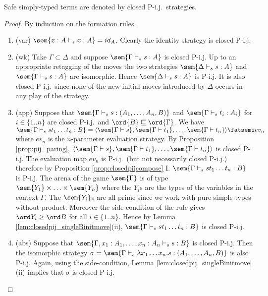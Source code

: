\begin{proposition}
\label{prop:safe_closepij_sem}
  Safe simply-typed terms are denoted by closed P-i.j.\ strategies.
\end{proposition}
\begin{proof}
  By induction on the formation rules.
  \begin{enumerate}
    \item (var) $\sem{x:A \vdash_s x:A } = id_A$. Clearly the
    identity strategy is closed P-i.j.

    \item (wk) Take $\Gamma \subset \Delta $ and suppose $\sem{\Gamma \vdash_s
    s : A}$ is closed P-i.j. Up to an appropriate retagging of
    the moves the two strategies $\sem{\Delta \vdash_s s : A}$
    and $\sem{\Gamma \vdash_s s : A}$ are isomorphic. Hence
    $\sem{\Delta \vdash_s s : A}$ is P-i.j. It is also closed
    P-i.j.\ since none of the new initial moves introduced by
    $\Delta$ occurs in any play of the strategy.

    \item (app) Suppose that $\sem{\Gamma \vdash_s s :
    (A_1,\ldots,A_n,B)}$ and $\sem{\Gamma \vdash_s t_i : A_i}$
    for $i \in \{1..n\}$ are closed P-i.j.\ and $\ord{B}
    \sqsubseteq \ord{\Gamma}$. We have $\sem{ \Gamma \vdash_s s
    t_1 \ldots t_n : B} = \langle \sem{\Gamma \vdash s},
    \sem{\Gamma \vdash t_1}, \ldots, \sem{\Gamma \vdash t_n}
    \rangle \fatsemi ev_n$ where $ev_n$ is the $n$-parameter
    evaluation strategy. By Proposition \ref{prop:pij_paring},
    $\langle \sem{\Gamma \vdash s}, \sem{\Gamma \vdash t_1} ,
    \ldots, \sem{\Gamma \vdash t_n} \rangle$ is closed P-i.j.
    The evaluation map $ev_n$ is P-i.j.\ (but not necessarily
    closed P-i.j.) therefore by Proposition
    \ref{prop:closedpijcompose} I. $\sem{ \Gamma \vdash_s s t_1
    \ldots t_n : B}$ is P-i.j. The arena of the game
    $\sem{\Gamma}$ is of type $\sem{Y_1} \times \ldots \times
    \sem{Y_n}$ where the $Y_i$s are the types of the variables
    in the context $\Gamma$. The $\sem{Y_i}$s are all prime
    since we work with pure simple types without product.
    Moreover the side-condition of the rule gives $\ord Y_i \geq
    \ord B$ for all $i \in \{1..n\}$. Hence by Lemma
    \ref{lem:closedpij_singleBinitmove}(ii), $\sem{ \Gamma
    \vdash_s s t_1 \ldots t_n : B}$ is closed P-i.j.

    \item (abs) Suppose that $\sem{\Gamma, x_1 : A_1, \ldots, x_n : A_n \vdash_s
    s : B}$ is closed P-i.j. Then the isomorphic strategy $\sigma = \sem{\Gamma \vdash_s \lambda
    x_1 \ldots x_n . s : (A_1,\ldots,A_n,B)}$ is also P-i.j.
    Again, using the side-condition, Lemma \ref{lem:closedpij_singleBinitmove}(ii)
    implies that $\sigma$ is closed P-i.j.
  \end{enumerate}
\end{proof}

